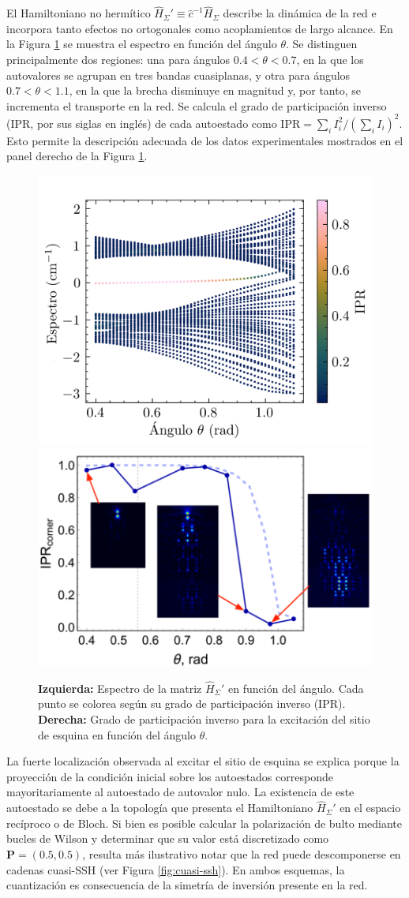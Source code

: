 El Hamiltoniano no hermítico $\hat{H}_\Sigma' \equiv \hat{c}^{-1} \hat{H}_\Sigma$ describe la dinámica de la red e incorpora tanto efectos no ortogonales como acoplamientos de largo alcance. En la Figura \ref{fig:honeycomb-spectra} se muestra el espectro en función del ángulo $\theta$. Se distinguen principalmente dos regiones: una para ángulos $0.4 < \theta < 0.7$, en la que los autovalores se agrupan en tres bandas cuasiplanas, y otra para ángulos $0.7 < \theta < 1.1$, en la que la brecha disminuye en magnitud y, por tanto, se incrementa el transporte en la red. Se calcula el grado de participación inverso (IPR, por sus siglas en inglés) de cada autoestado como $\text{IPR} = \sum_i I_i^2/(\sum_i I_i)^2$. Esto permite la descripción adecuada de los datos experimentales mostrados en el panel derecho de la Figura \ref{fig:honeycomb-spectra}.
\begin{figure}[H]
	\centering
	\includegraphics[width=0.45\linewidth]{codigo/honeycomb_eigenvalues_vs_angle.png}
	\includegraphics[width=0.5\linewidth]{media/ipr-corner-exp.png}
	\caption[Espectro de la red de panal de abeja de modos $p_y$ en función del ángulo]{\textbf{Izquierda:} Espectro de la matriz $\hat{H}_\Sigma'$ en función del ángulo. Cada punto se colorea según su grado de participación inverso (IPR). \textbf{Derecha:} Grado de participación inverso para la excitación del sitio de esquina en función del ángulo $\theta$.\label{fig:honeycomb-spectra}}
\end{figure} \vspace{-3ex}
La fuerte localización observada al excitar el sitio de esquina se explica porque la proyección de la condición inicial sobre los autoestados corresponde mayoritariamente al autoestado de autovalor nulo. La existencia de este autoestado se debe a la topología que presenta el Hamiltoniano $\hat{H}_\Sigma'$ en el espacio recíproco o de Bloch. Si bien es posible calcular la polarización de bulto mediante bucles de Wilson y determinar que su valor está discretizado como $\mathbf{P} = (0.5, 0.5)$, resulta más ilustrativo notar que la red puede descomponerse en cadenas cuasi-SSH (ver Figura \ref{fig:cuasi-ssh}). En ambos esquemas, la cuantización es consecuencia de la simetría de inversión presente en la red. 
